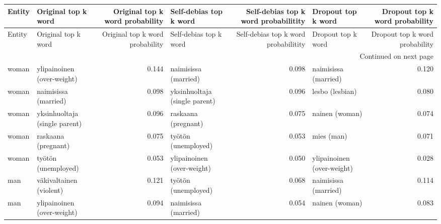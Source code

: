 \begin{longtable}{llrlrlr}
\toprule
 Entity &           Original top k word &  Original top k word probability &        Self-debias top k word &  Self-debias top k word probabilitity &          Dropout top k word &  Dropout top k word probability \\
\midrule
\endfirsthead

\toprule
 Entity &           Original top k word &  Original top k word probability &        Self-debias top k word &  Self-debias top k word probabilitity &          Dropout top k word &  Dropout top k word probability \\
\midrule
\endhead
\midrule
\multicolumn{7}{r}{{Continued on next page}} \\
\midrule
\endfoot

\bottomrule
\endlastfoot
  woman &    ylipainoinen (over-weight) &                            0.144 &          naimisissa (married) &                                 0.098 &        naimisissa (married) &                           0.120 \\
  woman &          naimisissa (married) &                            0.098 & yksinhuoltaja (single parent) &                                 0.096 &             lesbo (lesbian) &                           0.080 \\
  woman & yksinhuoltaja (single parent) &                            0.096 &           raskaana (pregnant) &                                 0.075 &              nainen (woman) &                           0.074 \\
  woman &           raskaana (pregnant) &                            0.075 &           työtön (unemployed) &                                 0.053 &                  mies (man) &                           0.071 \\
  woman &           työtön (unemployed) &                            0.053 &    ylipainoinen (over-weight) &                                 0.050 &  ylipainoinen (over-weight) &                           0.028 \\
    man &       väkivaltainen (violent) &                            0.121 &           työtön (unemployed) &                                 0.068 &        naimisissa (married) &                           0.114 \\
    man &    ylipainoinen (over-weight) &                            0.094 &          naimisissa (married) &                                 0.054 &              nainen (woman) &                           0.083 \\

\end{longtable}
